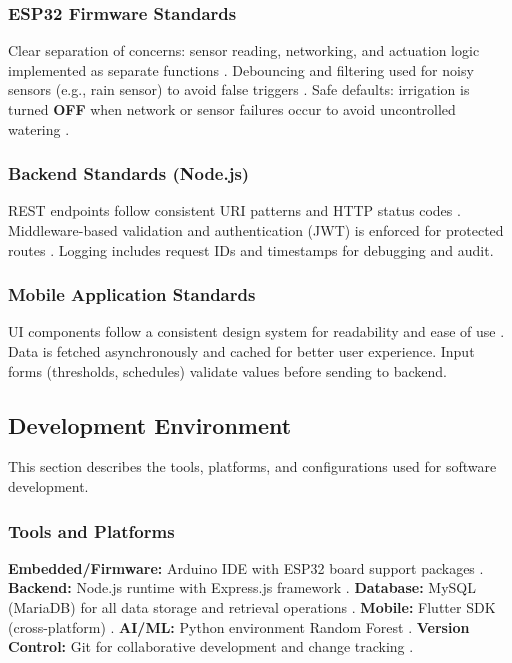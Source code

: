 \subsubsection{ESP32 Firmware Standards}
Clear separation of concerns: sensor reading, networking, and actuation logic implemented as separate functions \cite{hassebo2024esp32}. Debouncing and filtering used for noisy sensors (e.g., rain sensor) to avoid false triggers \cite{noisyiot2023}. Safe defaults: irrigation is turned \textbf{OFF} when network or sensor failures occur to avoid uncontrolled watering \cite{hassebo2024esp32}.


\subsubsection{Backend Standards (Node.js)}
REST endpoints follow consistent URI patterns and HTTP status codes \cite{thilakarathne2023fields}. Middleware-based validation and authentication (JWT) is enforced for protected routes \cite{jwtauth2017}. Logging includes request IDs and timestamps for debugging and audit.


\subsubsection{Mobile Application Standards}
UI components follow a consistent design system for readability and ease of use \cite{mobileui2022}. Data is fetched asynchronously and cached for better user experience. Input forms (thresholds, schedules) validate values before sending to backend.


\subsection{Development Environment}
\label{sec:dev-environment}

This section describes the tools, platforms, and configurations 
used for software development.

\subsubsection{Tools and Platforms}
\textbf{Embedded/Firmware:} Arduino IDE with ESP32 board support packages \cite{raj2021survey}. \textbf{Backend:} Node.js runtime with Express.js framework \cite{thilakarathne2023fields}. \textbf{Database:} MySQL (MariaDB) for all data storage and retrieval operations \cite{uotila2020db}. \textbf{Mobile:} Flutter SDK (cross-platform) \cite{khawas2018firebase}. \textbf{AI/ML:} Python environment Random Forest \cite{ali2025soilml}. \textbf{Version Control:} Git for collaborative development and change tracking \cite{sommerville2016software}.


